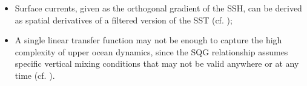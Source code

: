 \documentclass[10pt]{extarticle}
\begin{document}
\begin{itemize}
\itemsep 0pt
    \item Surface currents, given as the orthogonal gradient of the SSH, can be derived as spatial derivatives of a filtered version of the SST (cf. \cite{isern,tandeo});
     \item A single linear transfer function may not be enough to capture the high complexity of upper ocean dynamics, since the SQG relationship assumes specific vertical mixing conditions that may not be valid anywhere or at any time (cf. \cite{Lapeyre,Cristina,isern_fontanet}). %
\end{itemize}
\end{document}
